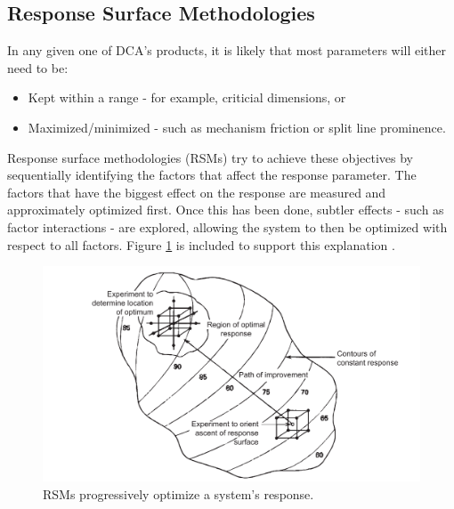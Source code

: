 \documentclass[11pt,a4paper,article]{memoir} %
\begin{document}
\subsection*{Response Surface Methodologies}
In any given one of DCA's products, it is likely that most parameters will either need to be:
\vspace{-14pt}
\begin{itemize}
	\item Kept within a range - for example, criticial dimensions, or
	\item Maximized/minimized - such as mechanism friction or split line prominence.
\end{itemize}
\vspace{-14pt}
Response surface methodologies (RSMs) try to achieve these objectives by sequentially identifying the factors that affect the response parameter. The factors that have the biggest effect on the response are measured and approximately optimized first. Once this has been done, subtler effects - such as factor interactions - are explored, allowing the system to then be optimized with respect to all factors. Figure \ref{fig:RSM_overview} is included to support this explanation \cite{montgomery2000design}.
\begin{figure}[h!]
\includegraphics[width=\textwidth]{RSM_overview.pdf}
\caption{RSMs progressively optimize a system's response.}
\label{fig:RSM_overview}
\end{figure}
\end{document}
